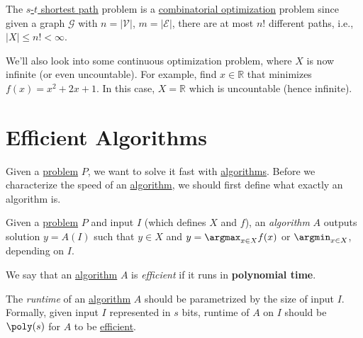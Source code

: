 \begin{eg}
	The \hyperref[eg:s-t-path]{\(s\)-\(t\) shortest path} problem is a \hyperref[def:combinatorial-optimization]{combinatorial optimization} problem since given a graph \(\mathcal{G} \) with \(n = \left\vert \mathcal{V}  \right\vert \), \(m = \left\vert \mathcal{E}  \right\vert \), there are at most \(n!\) different paths, i.e., \(\left\vert X \right\vert \leq n! < \infty\).
\end{eg}

\begin{note}
	We'll also look into some continuous optimization problem, where \(X\) is now infinite (or even uncountable). For example, find \(x\in \mathbb{R} \) that minimizes \(f(x)=x^{2} +2x + 1\). In this case, \(X = \mathbb{R} \) which is uncountable (hence infinite).
\end{note}

\section{Efficient Algorithms}
Given a \hyperref[def:computational-problem]{problem} \(P\), we want to solve it fast with \hyperref[def:algorithm]{algorithms}. Before we characterize the speed of an \hyperref[def:algorithm]{algorithm}, we should first define what exactly an algorithm is.

\begin{definition}[Algorithm]\label{def:algorithm}
	Given a \hyperref[def:computational-problem]{problem} \(P\) and input \(I\) (which defines \(X\) and \(f\)), an \emph{algorithm} \(A\) outputs solution \(y = A(I)\) such that \(y\in X\) and \(y = \argmax_{x\in X} f(x)\) or \(\argmin_{x\in X}\), depending on \(I\).
\end{definition}

\begin{definition}[Efficient]\label{def:efficient}
	We say that an \hyperref[def:algorithm]{algorithm} \(A\) is \emph{efficient} if it runs in \textbf{polynomial time}.
\end{definition}

\begin{remark}
	The \emph{runtime} of an \hyperref[def:algorithm]{algorithm} \(A\) should be parametrized by the size of input \(I\). Formally, given input \(I\) represented in \(s\) bits, runtime of \(A\) on \(I\) should be \(\poly(s)\) for \(A\) to be \hyperref[def:efficient]{efficient}.
\end{remark}


